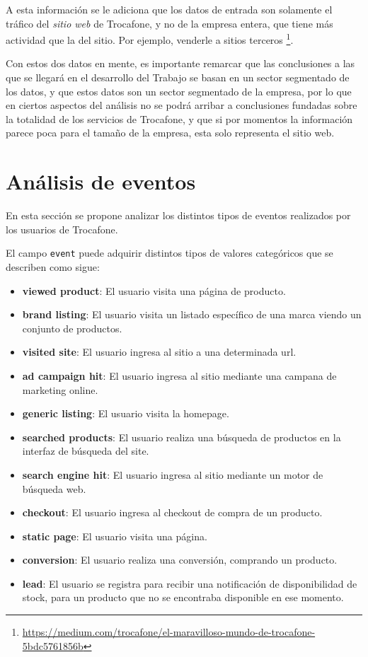 \documentclass[a4paper]{article}
\begin{document}
A esta información se le adiciona que los datos de entrada son solamente el tráfico del \textit{sitio web} de Trocafone, y no de la empresa entera, que tiene más actividad que la del sitio. Por ejemplo, venderle a sitios terceros \footnote{\url{https://medium.com/trocafone/el-maravilloso-mundo-de-trocafone-5bdc5761856b}}.

Con estos dos datos en mente, es importante remarcar que las conclusiones a las que se llegará en el desarrollo del Trabajo se basan en un sector segmentado de los datos, y que estos datos son un sector segmentado de la empresa, por lo que en ciertos aspectos del análisis no se podrá arribar a conclusiones fundadas sobre la totalidad de los servicios de Trocafone, y que si por momentos la información parece poca para el tamaño de la empresa, esta solo representa el sitio web.

\section{Análisis de eventos}

En esta sección se propone analizar los distintos tipos de eventos realizados por los usuarios de Trocafone. 

El campo \texttt{event} puede adquirir distintos tipos de valores categóricos que se describen como sigue:

\begin{itemize}
	\item \textbf{viewed product}: El usuario visita una página de producto.
	\item \textbf{brand listing}: El usuario visita un listado específico de una marca viendo un conjunto de productos.
	\item \textbf{visited site}:  El usuario ingresa al sitio a una determinada url.
	\item \textbf{ad campaign hit}: El usuario ingresa al sitio mediante una campana de marketing online.
	\item \textbf{generic listing}: El usuario visita la homepage.
	\item \textbf{searched products}: El usuario realiza una búsqueda de productos en la interfaz de búsqueda del site.
	\item \textbf{search engine hit}: El usuario ingresa al sitio mediante un motor de búsqueda web.
	\item \textbf{checkout}: El usuario ingresa al checkout de compra de un producto.
	\item \textbf{static page}:  El usuario visita una página.
	\item \textbf{conversion}: El usuario realiza una conversión, comprando un producto.
	\item \textbf{lead}: El usuario se registra para recibir una notificación de disponibilidad de stock, para un producto que no se encontraba disponible en ese momento.					
\end{itemize}
\end{document}
